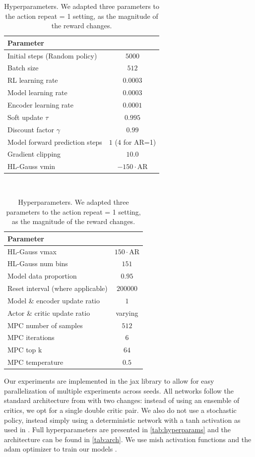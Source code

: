 \begin{table}
    \begin{tabular}{l|c}
        Parameter & \\\hline 
        Initial steps (Random policy) & $5000$  \\
        Batch size & $512$ \\
        RL learning rate & $0.0003$ \\
        Model learning rate & $0.0003$ \\
        Encoder learning rate & $0.0001$ \\
        Soft update $\tau$  & $0.995$ \\
        Discount factor $\gamma$  & $0.99$\\
        Model forward prediction steps & $1$ ($4$ for AR=1) \\
        Gradient clipping &  $10.0$ \\
        HL-Gauss vmin& $-150 \cdot \mathrm{AR}$ \\
    \end{tabular}
~
    \begin{tabular}{l|c}
        Parameter & \\\hline 
        HL-Gauss vmax& $150 \cdot \mathrm{AR}$\\ 
        HL-Gauss num bins& $151$\\
        Model data proportion& $0.95$\\
        Reset interval (where applicable)& $200000$\\
        Model \& encoder update ratio & $1$ \\
        Actor \& critic update ratio & varying \\
        MPC number of samples & $512$ \\
        MPC iterations& $6$ \\
        MPC top k& $64$\\
        MPC temperature& $0.5$
    \end{tabular}
    \caption{Hyperparameters. We adapted three parameters to the action repeat = 1 setting, as the magnitude of the reward changes.}
    \label{tab:hyperparams}
\end{table}

Our experiments are implemented in the jax library to allow for easy parallelization of multiple experiments across seeds.
All networks follow the standard architecture from \textcite{hansen2024tdmpc} with two changes: instead of using an ensemble of critics, we opt for a single double critic pair.
We also do not use a stochastic policy, instead simply using a deterministic network with a tanh activation as used in \textcite{ddpg,fujimoto2018addressing}.
Full hyperparameters are presented in \autoref{tab:hyperparams} and the architecture can be found in \autoref{tab:arch}.
We use mish activation functions \parencite{misra2020mish} and the adam optimizer to train our models \parencite{kingma2015adam}.

